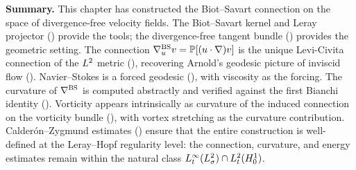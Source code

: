 \bigskip

\noindent\textbf{Summary.}
This chapter has constructed the Biot--Savart connection on the space of
divergence-free velocity fields.  The Biot--Savart kernel and Leray projector
() provide the tools; the divergence-free tangent bundle
() provides the geometric setting.  The connection
$\nabla^{\mathrm{BS}}_u v = \mathbb{P}[(u \cdot \nabla)v]$ is the unique Levi-Civita connection of the
$L^{2}$ metric (), recovering Arnold's geodesic picture of
inviscid flow ().  Navier--Stokes is a forced geodesic
(), with viscosity as the forcing.  The curvature of
$\nabla^{\mathrm{BS}}$ is computed abstractly and verified against the first Bianchi identity
().  Vorticity appears intrinsically as curvature of the
induced connection on the vorticity bundle (), with vortex
stretching as the curvature contribution.  Calder\'{o}n--Zygmund estimates
() ensure that the entire construction is well-defined at the
Leray--Hopf regularity level: the connection, curvature, and energy estimates remain
within the natural class $L^{\infty}_t(L^{2}_\sigma) \cap L^{2}_t(H^{1}_0)$.
